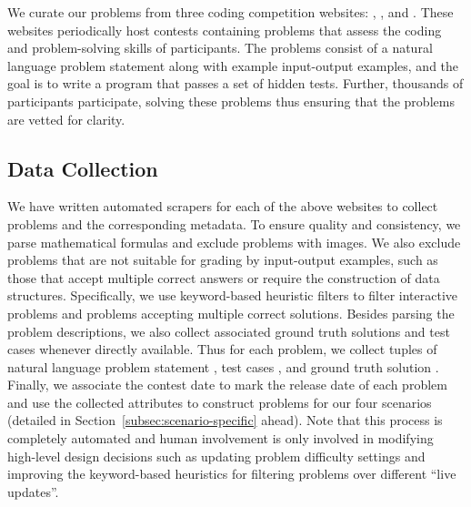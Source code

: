 We curate our problems from three coding competition websites: \leetcode{}, \atcoder{}, and \codeforces{}. 
These websites periodically host contests containing problems that assess the coding and problem-solving skills of participants.
The problems consist of a natural language problem statement along with example input-output examples, and the goal is to write a program that passes a set of hidden tests.
Further, thousands of participants participate, solving these problems thus ensuring that the problems are vetted for clarity.

\vspace{-3pt}
\subsection{Data Collection} 
We have written automated \html{} scrapers for each of the above websites to collect problems and the corresponding metadata.
To ensure quality and consistency, we parse mathematical formulas and exclude problems with images.
We also exclude problems that are not suitable for grading by input-output examples, such as those that accept multiple correct answers or require the construction of data structures.
Specifically, we use keyword-based heuristic filters to filter interactive problems and problems accepting multiple correct solutions.
Besides parsing the problem descriptions, we also collect associated ground truth solutions and test cases whenever directly available.
Thus for each problem, we collect tuples of  natural language problem statement \problem{}, 
test cases \tests{}, and ground truth solution \solution{}.
Finally, we associate the contest date \contestdate{} to mark the release date of each problem and 
use the collected attributes to construct problems for our four scenarios (detailed in Section~\ref{subsec:scenario-specific} ahead). 
Note that this process is completely automated and human involvement is only involved in modifying high-level design decisions such as updating problem difficulty settings and improving the keyword-based heuristics for filtering problems over different ``live updates''.

